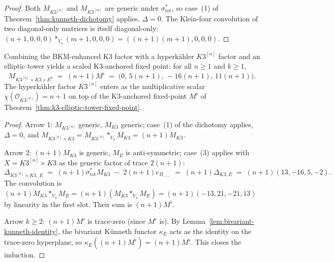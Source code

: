 \begin{proof}[Proof]
Both $M_{K3^{[n]}}$ and $M_{K3^{[m]}}$ are generic under
$\sigma_{\mathrm{tot}}^*$, so case~(1) of
Theorem~\ref{thm:kunneth-dichotomy} applies, $\Delta = 0$. The
Klein-four convolution of two diagonal-only matrices is itself
diagonal-only:
$(n + 1, 0, 0, 0) *_{V_4} (m + 1, 0, 0, 0)
= ((n + 1)(m + 1), 0, 0, 0)$.
\end{proof}

\begin{theorem}
\label{thm:cross-anchored-scaled-fixed-point}
Combining the BKM-enhanced K$3$ factor with a hyperk\"ahler $K3^{[n]}$
factor and an elliptic tower yields a scaled K$3$-anchored
fixed point: for all $n \geq 1$ and $k \geq 1$,
\[
 \boxed{\;
 M_{K3^{[n]} \times K3 \times E^k}
 \;=\; (n + 1) M^\flat
 \;=\; \bigl(0,\, 5 (n + 1),\, -16 (n + 1),\, 11 (n + 1)\bigr).
 \;}
\]
The hyperk\"ahler factor $K3^{[n]}$ enters as the multiplicative
scalar $\chi(\mathcal{O}_{K3^{[n]}}) = n + 1$ on top of the
K$3$-anchored fixed-point $M^\flat$ of
Theorem~\ref{thm:k3-elliptic-tower-fixed-point}.
\end{theorem}

\begin{proof}[Proof]
Arrow 1: $M_{K3^{[n]}}$ generic, $M_{K3}$ generic; case~(1) of the
dichotomy applies, $\Delta = 0$, and
$M_{K3^{[n]} \times K3} = M_{K3^{[n]}} *_{V_4} M_{K3} = (n + 1) M_{K3}$.

Arrow 2: $(n + 1) M_{K3}$ is generic, $M_E$ is anti-symmetric;
case~(3) applies with $X = K3^{[n]} \times K3$ as the generic factor
of trace $2 (n + 1)$:
\[
 \Delta_{K3^{[n]} \times K3,\, E}
 \;=\; (n + 1) \sigma_{\mathrm{tot}}^* M_{K3}
 \;-\; 2 (n + 1) e_{\Pi_{--}}
 \;=\; (n + 1) \Delta_{K3, E}
 \;=\; (n + 1)(13, -16, 5, -2).
\]
The convolution is
$(n + 1) M_{K3} *_{V_4} M_E = (n + 1)(M_{K3} *_{V_4} M_E)
= (n + 1)(-13, 21, -21, 13)$ by linearity in the first slot. Their
sum is $(n + 1) M^\flat$.

Arrow $k \geq 2$: $(n + 1) M^\flat$ is trace-zero
\textup{(}since $M^\flat$ is\textup{).} By
Lemma~\ref{lem:bivariant-kunneth-identity}, the bivariant K\"unneth
functor $\kappa_E$ acts as the identity on the trace-zero hyperplane,
so $\kappa_E((n + 1) M^\flat) = (n + 1) M^\flat$. This closes the
induction.
\end{proof}

